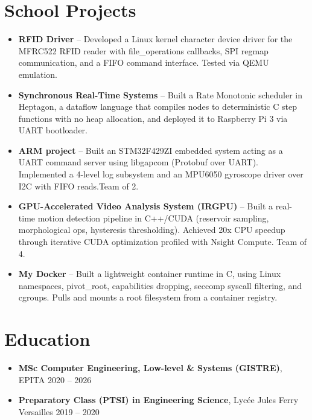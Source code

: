 \documentclass[9pt,a4paper]{article}
\begin{document}
\section*{School Projects}
\begin{tcolorbox}[mybox]
\begin{itemize}
\item \textbf{RFID Driver} -- Developed a Linux kernel character device driver for the MFRC522 RFID reader with file\_operations callbacks, SPI regmap communication, and a FIFO command interface. Tested via QEMU emulation.

\item \textbf{Synchronous Real-Time Systems} -- Built a Rate Monotonic scheduler in Heptagon, a dataflow language that compiles nodes to deterministic C step functions with no heap allocation, and deployed it to Raspberry Pi 3 via UART bootloader.

\item \textbf{ARM project} -- Built an STM32F429ZI embedded system acting as a UART command server using libgapcom (Protobuf over UART). Implemented a 4-level log subsystem and an MPU6050 gyroscope driver over I2C with FIFO reads.Team of 2.

\item \textbf{GPU-Accelerated Video Analysis System (IRGPU)} -- Built a real-time motion detection pipeline in C++/CUDA (reservoir sampling, morphological ops, hysteresis thresholding). Achieved 20x CPU speedup through iterative CUDA optimization profiled with Nsight Compute. Team of 4.

\item \textbf{My Docker} -- Built a lightweight container runtime in C, using Linux namespaces, pivot\_root, capabilities dropping, seccomp syscall filtering, and cgroups. Pulls and mounts a root filesystem from a container registry.
\end{itemize}
\end{tcolorbox}


\section*{Education}
\begin{tcolorbox}[mybox]
\begin{itemize}
\item \textbf{MSc Computer Engineering, Low-level \& Systems (GISTRE)}, EPITA {\small{\hfill 2020 – 2026}}

\item \textbf{Preparatory Class (PTSI) in Engineering Science}, Lycée Jules Ferry Versailles {\small{\hfill 2019 – 2020}}
\end{itemize}
\end{tcolorbox}
\end{document}
